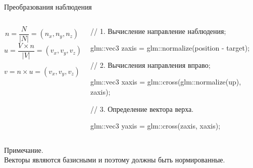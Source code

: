 \documentclass{beamer}
\begin{document}
	
	\begin{frame}{Преобразования наблюдения}

		\begin{columns}
			\begin{column}{0.4\textwidth}
				\[
					n = \frac{N}{|N|}	= (n_x, n_y, n_z)
				\]
				\[
					u = \frac{V \times n }{|V|} = (v_x,v_y,v_z)	
				\]
		
				\[
					v = n \times u = (v_x, v_y, v_z)	
				\]
		
			\end{column}
			\begin{column}{0.6\textwidth}
				// 1. Вычисление направление наблюдения;

				glm::vec3 zaxis = glm::normalize(position - target);
				
				// 2. Вычисления направления вправо;
				
				glm::vec3 xaxis = glm::cross(glm::normalize(up), zaxis);
				
				// 3. Определение вектора верха.
				
				glm::vec3 yaxis = glm::cross(zaxis, xaxis);
			\end{column}
		\end{columns}

		Примечание. \\
		Векторы являются базисными и поэтому должны быть нормированные.
		
	\end{frame}
\end{document}
